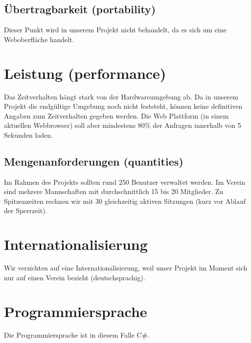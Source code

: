 	\subsection {Übertragbarkeit (portability)}
	Dieser Punkt wird in unserem Projekt nicht behandelt, da es sich um eine Weboberfläche handelt.
	
	\section{Leistung (performance)}
	Das Zeitverhalten hängt stark von der Hardwareumgebung ab. Da in unserem Projekt die endgültige Umgebung noch nicht feststeht, können keine definitiven Angaben zum Zeitverhalten gegeben werden. Die Web Plattform (in einem aktuellen Webbrowser) soll aber mindestens 80\% der Anfragen innerhalb von 5 Sekunden laden. 
	
	\subsection{Mengenanforderungen (quantities)}
	Im Rahmen des Projekts sollten rund 250 Benutzer verwaltet werden. Im Verein sind mehrere Mannschaften mit durchschnittlich 15 bis 20 Mitglieder. 
	Zu Spitzenzeiten rechnen wir mit 30 gleichzeitig aktiven Sitzungen (kurz vor Ablauf der Sperrzeit).  
	
	
	\section{Internationalisierung}
	Wir verzichten auf eine Internationalisierung, weil unser Projekt im Moment sich nur auf einen Verein bezieht (deutschsprachig).
	
	\section{Programmiersprache}
	Die Programmiersprache ist in diesem Falle C\#.

	

